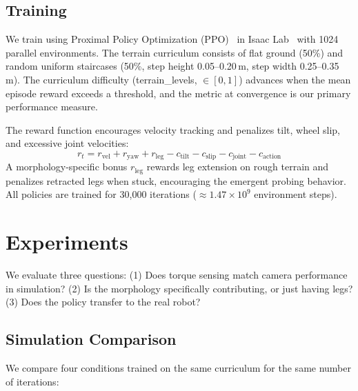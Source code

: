 \documentclass{article}
\begin{document}
\subsection{Training}
\label{sec:training}

We train using Proximal Policy Optimization (PPO)~\citep{schulman2017proximal} in
Isaac Lab~\citep{mittal2023orbit} with 1024 parallel environments. The terrain curriculum
consists of flat ground (50\%) and random uniform staircases (50\%, step height
0.05--0.20\,m, step width 0.25--0.35\,m). The curriculum difficulty (terrain\_levels,
$\in [0, 1]$) advances when the mean episode reward exceeds a threshold, and the metric
at convergence is our primary performance measure.

The reward function encourages velocity tracking and penalizes tilt, wheel slip,
and excessive joint velocities:
\begin{equation}
r_t = r_\text{vel} + r_\text{yaw} + r_\text{leg} - c_\text{tilt} - c_\text{slip}
      - c_\text{joint} - c_\text{action}
\end{equation}
A morphology-specific bonus $r_\text{leg}$ rewards leg extension on rough terrain and
penalizes retracted legs when stuck, encouraging the emergent probing behavior. All
policies are trained for 30{,}000 iterations ($\approx 1.47 \times 10^9$ environment steps).


\section{Experiments}
\label{sec:experiments}

We evaluate three questions: (1) Does torque sensing match camera performance in
simulation? (2) Is the morphology specifically contributing, or just having legs?
(3) Does the policy transfer to the real robot?

\subsection{Simulation Comparison}
\label{sec:sim_comparison}

We compare four conditions trained on the same curriculum for the same number of
iterations:
\end{document}
